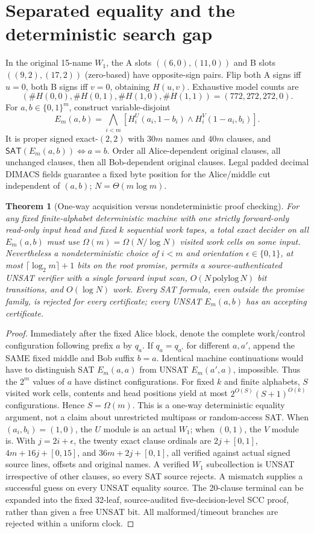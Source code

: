 \documentclass[11pt]{article}
\newtheorem{theorem}{Theorem}
\newcommand{\SAT}{\mathsf{SAT}}
\begin{document}
\section{Separated equality and the deterministic search gap}
In the original 15-name $W_1$, the A slots
$((6,0),(11,0))$ and B slots $((9,2),(17,2))$ (zero-based)
have opposite-sign pairs. Flip both A signs iff $u=0$,
both B signs iff $v=0$, obtaining $H(u,v)$.
Exhaustive model counts are
\[
 (\#H(0,0),\#H(0,1),\#H(1,0),\#H(1,1))
 =(772,272,272,0). \tag{4}
\]
For $a,b\in\{0,1\}^m$, construct variable-disjoint
\[
 E_m(a,b)=\bigwedge_{i<m}
 [H_i^U(a_i,1-b_i)\land H_i^V(1-a_i,b_i)].
 \tag{5}
\]
It is proper signed exact-$(2,2)$ with $30m$ names and $40m$
clauses, and $\SAT(E_m(a,b))\iff a=b$.
Order all Alice-dependent original clauses, all unchanged clauses,
then all Bob-dependent original clauses. Legal padded decimal DIMACS
fields guarantee a fixed byte position for the Alice/middle cut
independent of $(a,b)$; $N=\Theta(m\log m)$.
\begin{theorem}[One-way acquisition versus nondeterministic proof checking]
For any fixed finite-alphabet deterministic machine with one
strictly forward-only read-only input head and fixed $k$ sequential
work tapes, a total exact decider on all $E_m(a,b)$ must use
$\Omega(m)=\Omega(N/\log N)$ visited work cells on some input.
Nevertheless a nondeterministic choice of $i<m$ and orientation
$\epsilon\in\{0,1\}$, at most
$\lceil\log_2m\rceil+1$ bits on the root promise, permits a
source-authenticated UNSAT verifier with a single forward input
scan, $O(N\,\mathrm{polylog}\,N)$ bit transitions,
and $O(\log N)$ work. Every SAT formula, even outside the
promise family, is rejected for every certificate; every UNSAT
$E_m(a,b)$ has an accepting certificate.
\end{theorem}
\begin{proof}
Immediately after the fixed Alice block, denote the complete
work/control configuration following prefix $a$ by $q_a$.
If $q_a=q_{a'}$ for different $a,a'$, append the SAME
fixed middle and Bob suffix $b=a$. Identical machine
continuations would have to distinguish SAT $E_m(a,a)$
from UNSAT $E_m(a',a)$, impossible.
Thus the $2^m$ values of $a$ have distinct configurations.
For fixed $k$ and finite alphabets, $S$ visited work cells,
contents and head positions yield at most
$2^{O(S)}(S+1)^{O(k)}$ configurations. Hence $S=\Omega(m)$.
This is a one-way deterministic equality argument, not
a claim about unrestricted multipass or random-access SAT.
When $(a_i,b_i)=(1,0)$, the $U$ module is an actual $W_1$;
when $(0,1)$, the $V$ module is. With $j=2i+\epsilon$,
the twenty exact clause ordinals are $2j+[0,1]$,
$4m+16j+[0,15]$, and $36m+2j+[0,1]$, all verified
against actual signed source lines, offsets and original names.
A verified $W_1$ subcollection is UNSAT irrespective of other
clauses, so every SAT source rejects. A mismatch supplies a
successful guess on every UNSAT equality source. The 20-clause
terminal can be expanded into the fixed 32-leaf, source-audited
five-decision-level SCC proof, rather than given a free UNSAT bit.
All malformed/timeout branches are rejected within a uniform clock.
\end{proof}
\end{document}
